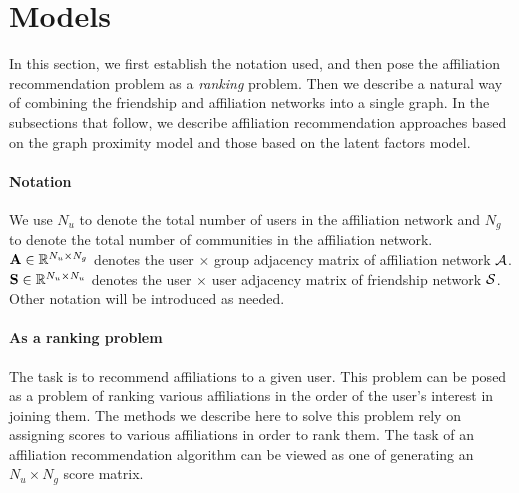 \documentclass{sig-alternate}
\begin{document}
\section{Models}
\label{Models}
In this section, we first establish the notation used, and then pose the affiliation recommendation problem as a \emph{ranking} problem. Then we describe a natural way of combining the friendship and affiliation networks into a single graph. In the subsections that follow, we describe affiliation recommendation approaches based on the graph proximity model and those based on the latent factors model.

\paragraph*{Notation}
We use $N_u$ to denote the total number of users in the affiliation network and $N_g$ to denote the total number of communities in the affiliation network. $\mathbf{A} \in \mathbb{R}^{N_u \times N_g}$ denotes the user $\times$ group adjacency matrix of affiliation network $\mathcal{A}$. $\mathbf{S} \in \mathbb{R}^{N_u \times N_u}$ denotes the user $\times$ user adjacency matrix of friendship network $\mathcal{S}$. Other notation will be introduced as needed.

\paragraph*{As a ranking problem}
The task is to recommend affiliations to a given user. This problem can be posed as a problem of ranking various affiliations in the order of the user's interest in joining them. The methods we describe here to solve this problem rely on assigning scores to various affiliations in order to rank them. The task of an affiliation recommendation algorithm can be viewed as one of generating an $N_u \times N_g$ score matrix. 
\end{document}
